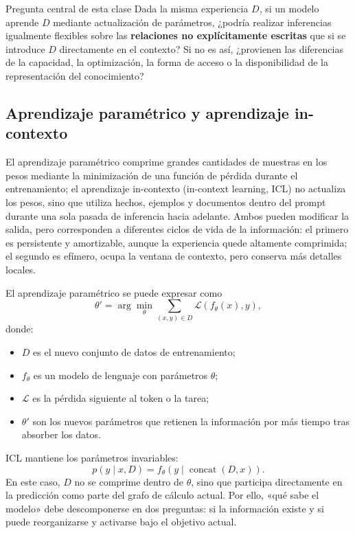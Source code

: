 \begin{importantbox}{Pregunta central de esta clase}
Dada la misma experiencia $D$, si un modelo aprende $D$ mediante actualización de parámetros, ¿podría realizar inferencias igualmente flexibles sobre las \textbf{relaciones no explícitamente escritas} que si se introduce $D$ directamente en el contexto? Si no es así, ¿provienen las diferencias de la capacidad, la optimización, la forma de acceso o la disponibilidad de la representación del conocimiento?
\end{importantbox}

\subsection{Aprendizaje paramétrico y aprendizaje in-contexto}

El aprendizaje paramétrico comprime grandes cantidades de muestras en los pesos mediante la minimización de una función de pérdida durante el entrenamiento; el aprendizaje in-contexto (in-context learning, ICL) no actualiza los pesos, sino que utiliza hechos, ejemplos y documentos dentro del prompt durante una sola pasada de inferencia hacia adelante. Ambos pueden modificar la salida, pero corresponden a diferentes ciclos de vida de la información: el primero es persistente y amortizable, aunque la experiencia quede altamente comprimida; el segundo es efímero, ocupa la ventana de contexto, pero conserva más detalles locales.


El aprendizaje paramétrico se puede expresar como
$$
\theta' = \arg\min_{\theta}\sum_{(x,y)\in D}\mathcal{L}\!\left(f_{\theta}(x),y\right),
$$
donde:
\begin{itemize}
  \item $D$ es el nuevo conjunto de datos de entrenamiento;
  \item $f_{\theta}$ es un modelo de lenguaje con parámetros $\theta$;
  \item $\mathcal{L}$ es la pérdida siguiente al token o la tarea;
  \item $\theta'$ son los nuevos parámetros que retienen la información por más tiempo tras absorber los datos.
\end{itemize}

ICL mantiene los parámetros invariables:
$$
p(y\mid x,D)=f_{\theta}\!\left(y\mid \operatorname{concat}(D,x)\right).
$$
En este caso, $D$ no se comprime dentro de $\theta$, sino que participa directamente en la predicción como parte del grafo de cálculo actual. Por ello, «qué sabe el modelo» debe descomponerse en dos preguntas: si la información existe y si puede reorganizarse y activarse bajo el objetivo actual.

